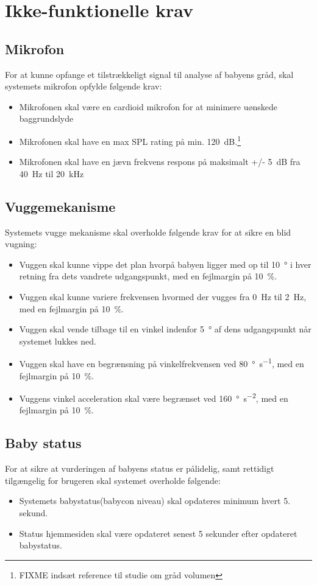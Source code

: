 \section{Ikke-funktionelle krav}

\subsection*{Mikrofon}
For at kunne opfange et tilstrækkeligt signal til analyse af babyens gråd, skal systemets mikrofon opfylde følgende krav:
\begin{itemize}
\item Mikrofonen skal være en cardioid mikrofon for at minimere uønskede baggrundslyde
\item Mikrofonen skal have en max SPL rating på min. \SI{120}{\dB}.\footnote{FIXME indsæt reference til studie om gråd volumen}
\item Mikrofonen skal have en jævn frekvens respons på maksimalt +/- \SI{5}{\dB} fra \SI{40}{\hertz} til \SI{20}{\kilo\hertz}
\end{itemize}

\subsection*{Vuggemekanisme}

Systemets vugge mekanisme skal overholde følgende krav for at sikre en blid vugning:
\begin{itemize}
\item Vuggen skal kunne vippe det plan hvorpå babyen ligger med op til \SI{10}{\degree} i hver retning fra dets vandrete udgangspunkt, med en fejlmargin på \SI{10}{\percent}.
\item Vuggen skal kunne variere frekvensen hvormed der vugges fra \SI{0}{\hertz} til \SI{2}{\hertz}, med en fejlmargin på \SI{10}{\percent}.
\item Vuggen skal vende tilbage til en vinkel indenfor \SI{5}{\degree} af dens udgangspunkt når systemet lukkes ned.
\item Vuggen skal have en begrænsning på vinkelfrekvensen ved \SI{80}{\degree\per\second}, med en fejlmargin på \SI{10}{\percent}.
\item Vuggens vinkel acceleration skal være begrænset ved \SI{160}{\degree\per\square\second}, med en fejlmargin på \SI{10}{\percent}.
\end{itemize}

\subsection*{Baby status}
For at sikre at vurderingen af babyens status er pålidelig, samt rettidigt tilgængelig for brugeren skal systemet overholde følgende:
\begin{itemize}
\item Systemets babystatus(babycon niveau) skal opdateres minimum hvert 5. sekund.
\item Status hjemmesiden skal være opdateret senest 5 sekunder efter opdateret babystatus.
\end{itemize}
